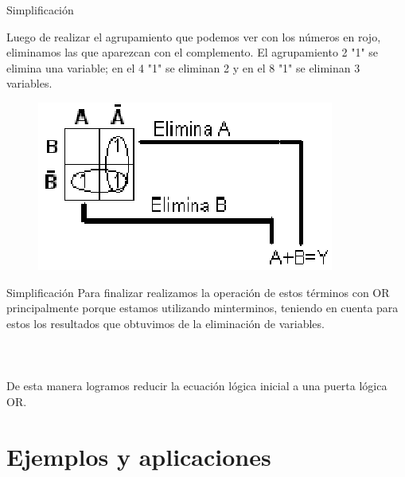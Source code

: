 \documentclass[aspectratio=169]{beamer}
\begin{document}
\begin{frame}{Simplificación }
    
    Luego de realizar el agrupamiento que podemos ver con los números en rojo, eliminamos las que aparezcan con el complemento. El agrupamiento 2 "1" se elimina una variable; en el 4 "1" se eliminan 2 y en el 8 "1" se eliminan 3 variables.
    
    \begin{figure}
        \includegraphics[scale=.4]{fig/kar_2.png}
    \end{figure}
\end{frame}

\begin{frame}{Simplificación }
    Para finalizar realizamos la operación de estos términos con OR principalmente porque estamos utilizando minterminos, teniendo en cuenta para estos los resultados que obtuvimos de la eliminación de variables.\\
    \hspace{2px}\\
    \\
    \hspace{2px}\\
    De esta manera logramos reducir la ecuación lógica inicial a una puerta lógica OR. 
    
    
\end{frame}


\section{Ejemplos y aplicaciones}
\end{document}
